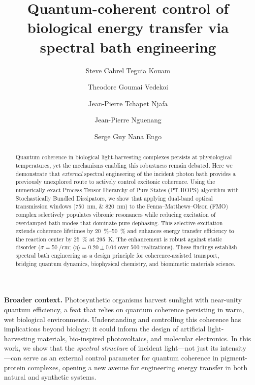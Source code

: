 \documentclass[11pt,a4paper]{article}
\title{\textbf{Quantum-coherent control of biological energy transfer via spectral bath engineering}}
\author[1,*]{Steve Cabrel Teguia Kouam}
\author[2]{Theodore Goumai Vedekoi}
\author[2]{Jean-Pierre Tchapet Njafa}
\author[1]{Jean-Pierre Nguenang}
\author[2]{Serge Guy Nana Engo}
\affil[1]{\small Department of Physics, Faculty of Science, University of Douala, Cameroon}
\affil[2]{\small Department of Physics, Faculty of Science, University of Yaoundé I, Cameroon}
\affil[*]{\textit{Corresponding author: steve.teguia@facsciences-uy1.cm}}
\date{\vspace{-5ex}}
\begin{document}
\maketitle

\noindent\textbf{Broader context.}
Photosynthetic organisms harvest sunlight with near-unity quantum efficiency, a feat that relies on quantum coherence persisting in warm, wet biological environments. Understanding and controlling this coherence has implications beyond biology: it could inform the design of artificial light-harvesting materials, bio-inspired photovoltaics, and molecular electronics. In this work, we show that the \textit{spectral structure} of incident light---not just its intensity---can serve as an external control parameter for quantum coherence in pigment-protein complexes, opening a new avenue for engineering energy transfer in both natural and synthetic systems.

\vspace{1em}

\begin{abstract}
Quantum coherence in biological light-harvesting complexes persists at physiological temperatures, yet the mechanisms enabling this robustness remain debated. Here we demonstrate that \textit{external} spectral engineering of the incident photon bath provides a previously unexplored route to actively control excitonic coherence. Using the numerically exact Process Tensor Hierarchy of Pure States (PT-HOPS) algorithm with Stochastically Bundled Dissipators, we show that applying dual-band optical transmission windows (\SIlist{750;820}{\nano\meter}) to the Fenna--Matthews--Olson (FMO) complex selectively populates vibronic resonances while reducing excitation of overdamped bath modes that dominate pure dephasing. This selective excitation extends coherence lifetimes by \SIrange{20}{50}{\percent} and enhances energy transfer efficiency to the reaction center by \SI{25}{\percent} at \SI{295}{\kelvin}. The enhancement is robust against static disorder ($\sigma = \SI{50}{\per\centi\meter}$; $\langle\eta\rangle = 0.20 \pm 0.04$ over \num{500} realizations). These findings establish spectral bath engineering as a design principle for coherence-assisted transport, bridging quantum dynamics, biophysical chemistry, and biomimetic materials science.
\end{abstract}
\end{document}
